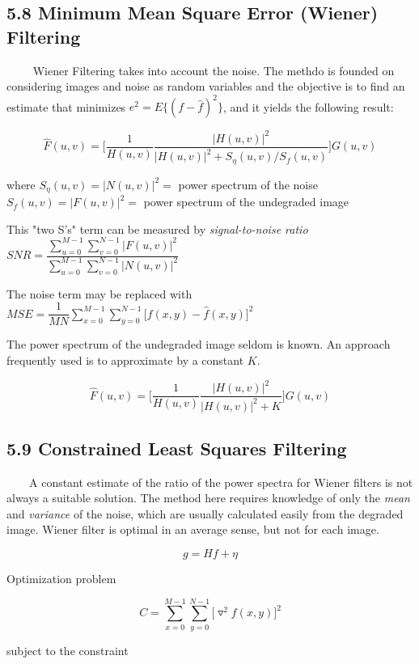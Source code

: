 \documentclass[]{article}
\begin{document}
\subsection{5.8 Minimum Mean Square Error (Wiener)
Filtering}\label{header-n834}

\(\quad\quad\) Wiener Filtering takes into account the noise. The methdo
is founded on considering images and noise as random variables and the
objective is to find an estimate that minimizes
\(e^2=E\{(f-\hat{f})^2\}\), and it yields the following result:

\[\hat{F}(u,v)=\Bigg[\dfrac{1}{H(u,v)}\dfrac{|H(u,v)|^2}{|H(u,v)|^2+S_\eta(u,v)/S_f(u,v)}\Bigg]G(u,v)\]

where \(S_\eta(u,v)=|N(u,v)|^2=\) power spectrum of the noise\\
 \(S_f(u,v)=|F(u,v)|^2=\) power spectrum of the undegraded image

This "two S's" term can be measured by \emph{signal-to-noise ratio}
\(SNR=\dfrac{\sum\limits^{M-1}_{u=0}\sum\limits^{N-1}_{v=0}|F(u,v)|^2}{\sum\limits^{M-1}_{u=0}\sum\limits^{N-1}_{v=0}|N(u,v)|^2}\)

The noise term may be replaced with
\(MSE=\dfrac{1}{MN}\sum\limits^{M-1}_{x=0}\sum\limits^{N-1}_{y=0}\big[f(x,y)-\hat{f}(x,y)\big]^2\)

The power spectrum of the undegraded image seldom is known. An approach
frequently used is to approximate by a constant \(K\).

\[\hat{F}(u,v)=\Bigg[\dfrac{1}{H(u,v)}\dfrac{|H(u,v)|^2}{|H(u,v)|^2+K}\Bigg]G(u,v)\]

\subsection{5.9 Constrained Least Squares Filtering}\label{header-n848}

\(\quad\quad\)A constant estimate of the ratio of the power spectra for
Wiener filters is not always a suitable solution. The method here
requires knowledge of only the \emph{mean} and \emph{variance} of the
noise, which are usually calculated easily from the degraded image.
Wiener filter is optimal in an average sense, but not for each image.

\[g=Hf+\eta\]

Optimization problem

\[C=\sum\limits^{M-1}_{x=0}\sum\limits^{N-1}_{y=0}\big[\triangledown^2f(x,y)\big]^2\]

subject to the constraint
\end{document}
